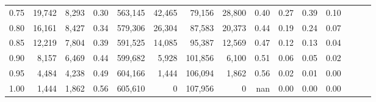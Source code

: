 \begin{tabular}{rrrrrrrrrrrrrrr}
0.75 &  19,742 &  8,293 &  0.30 &  563,145 &   42,465 &   79,156 &   28,800 &  0.40 &  0.27 &  0.39 &      0.10 \\
0.80 &  16,161 &  8,427 &  0.34 &  579,306 &   26,304 &   87,583 &   20,373 &  0.44 &  0.19 &  0.24 &      0.07 \\
0.85 &  12,219 &  7,804 &  0.39 &  591,525 &   14,085 &   95,387 &   12,569 &  0.47 &  0.12 &  0.13 &      0.04 \\
0.90 &   8,157 &  6,469 &  0.44 &  599,682 &    5,928 &  101,856 &    6,100 &  0.51 &  0.06 &  0.05 &      0.02 \\
0.95 &   4,484 &  4,238 &  0.49 &  604,166 &    1,444 &  106,094 &    1,862 &  0.56 &  0.02 &  0.01 &      0.00 \\
1.00 &   1,444 &  1,862 &  0.56 &  605,610 &        0 &  107,956 &        0 &   nan &  0.00 &  0.00 &      0.00 \\
\bottomrule
\end{tabular}
